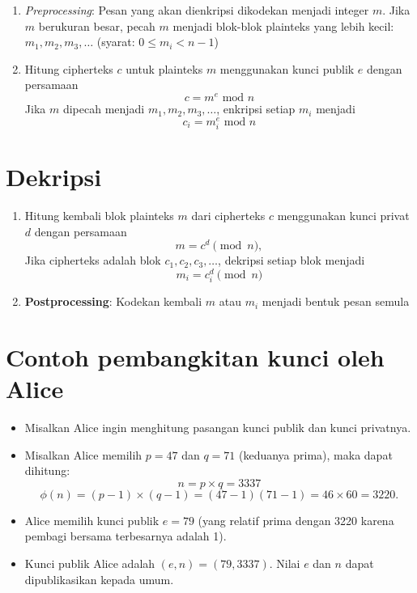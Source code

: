 \documentclass{article}
\begin{document}
\begin{enumerate}
    \item \textit{Preprocessing}: Pesan yang akan dienkripsi dikodekan menjadi integer $m$. Jika $m$ berukuran besar, pecah $m$ menjadi blok-blok plainteks yang lebih kecil: $m_1, m_2, m_3, \dots$ (syarat: $0 \le m_i < n - 1$)
    \item Hitung cipherteks $c$ untuk plainteks $m$ menggunakan kunci publik $e$ dengan persamaan
    \[ c = m^e \text{ mod } n \]
    Jika $m$ dipecah menjadi $m_1, m_2, m_3, \dots$, enkripsi setiap $m_i$ menjadi
    \[ c_i = m_i^e \text{ mod } n \]
\end{enumerate}

\newpage


\section*{Dekripsi}

\begin{enumerate}
    \item Hitung kembali blok plainteks $m$ dari cipherteks $c$ menggunakan kunci privat $d$ dengan persamaan
    \[ m = c^d \pmod{n}, \]
    Jika cipherteks adalah blok $c_1, c_2, c_3, \dots$, dekripsi setiap blok menjadi
    \[ m_i = c_i^d \pmod{n} \]
    
    \item \textbf{Postprocessing}: Kodekan kembali $m$ atau $m_i$ menjadi bentuk pesan semula
\end{enumerate}

\newpage


\section*{Contoh pembangkitan kunci oleh Alice}

\begin{itemize}
    \item Misalkan Alice ingin menghitung pasangan kunci publik dan kunci privatnya.
    \item Misalkan Alice memilih $p = 47$ dan $q = 71$ (keduanya prima), maka dapat dihitung:
    \[ n = p \times q = 3337 \]
    \[ \phi(n) = (p - 1) \times (q - 1) = (47 - 1)(71 - 1) = 46 \times 60 = 3220. \]
    \item Alice memilih kunci publik $e = 79$ (yang relatif prima dengan 3220 karena pembagi bersama terbesarnya adalah 1).
    \item Kunci publik Alice adalah $(e, n) = (79, 3337)$. Nilai $e$ dan $n$ dapat dipublikasikan kepada umum.
\end{itemize}
\end{document}
